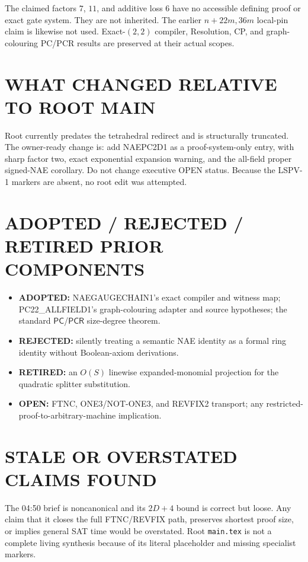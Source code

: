 \documentclass[11pt]{article}
\newcommand{\PC}{\ensuremath{\mathsf{PC}}}
\newcommand{\PCR}{\ensuremath{\mathsf{PCR}}}
\begin{document}
The claimed factors $7$, $11$, and additive loss $6$ have no accessible
defining proof or exact gate system.  They are not inherited.  The earlier
$n+22m,36m$ local-pin claim is likewise not used.  Exact-$(2,2)$ compiler,
Resolution, CP, and graph-colouring PC/PCR results are preserved at their
actual scopes.

\section{WHAT CHANGED RELATIVE TO ROOT MAIN}
Root currently predates the tetrahedral redirect and is structurally
truncated.  The owner-ready change is: add NAEPC2D1 as a proof-system-only
entry, with sharp factor two, exact exponential expansion warning, and the
all-field proper signed-NAE corollary.  Do not change executive OPEN status.
Because the LSPV-1 markers are absent, no root edit was attempted.

\section{ADOPTED / REJECTED / RETIRED PRIOR COMPONENTS}
\begin{itemize}
\item \textbf{ADOPTED:} NAEGAUGECHAIN1's exact compiler and witness map;
PC22\_ALLFIELD1's graph-colouring adapter and source hypotheses; the standard
\PC/\PCR{} size-degree theorem.
\item \textbf{REJECTED:} silently treating a semantic NAE identity as a formal
ring identity without Boolean-axiom derivations.
\item \textbf{RETIRED:} an $O(S)$ linewise expanded-monomial projection for
the quadratic splitter substitution.
\item \textbf{OPEN:} FTNC, ONE3/NOT-ONE3, and REVFIX2 transport; any
restricted-proof-to-arbitrary-machine implication.
\end{itemize}

\section{STALE OR OVERSTATED CLAIMS FOUND}
The 04:50 brief is noncanonical and its $2D+4$ bound is correct but loose.
Any claim that it closes the full FTNC/REVFIX path, preserves shortest proof
size, or implies general SAT time would be overstated.  Root \texttt{main.tex}
is not a complete living synthesis because of its literal placeholder and
missing specialist markers.
\end{document}
